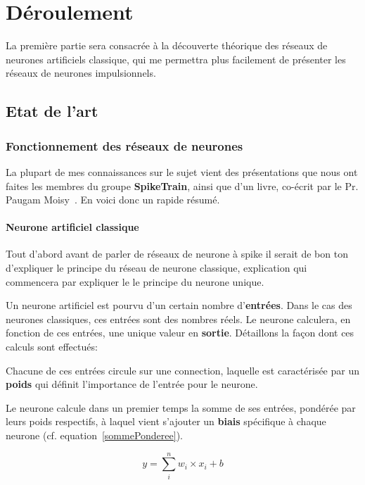 \hypertarget{Deroulement}{%
\chapter{Déroulement}\label{Déroulement}}



La première partie sera consacrée à la découverte théorique des réseaux de neurones artificiels classique, qui me permettra plus facilement de présenter les réseaux de neurones impulsionnels.

\section{Etat de l'art}
\subsection{Fonctionnement des réseaux de neurones}
La plupart de mes connaissances sur le sujet vient des présentations que nous ont faites les membres du groupe \textbf{SpikeTrain}, ainsi que d'un livre, co-écrit par le Pr. Paugam Moisy~\cite{naturalHandbook}.
En voici donc un rapide résumé.

\subsubsection{Neurone artificiel classique}
\label{neuroneClassique}
Tout d'abord avant de parler de réseaux de neurone à spike il serait de bon ton d'expliquer le principe du réseau de neurone classique, explication qui commencera par expliquer le
le principe du neurone unique.

Un neurone artificiel est pourvu d'un certain nombre d'\textbf{entrées}. Dans le cas des neurones classiques, ces entrées sont des nombres réels. Le neurone calculera, en fonction de ces entrées, une unique valeur en \textbf{sortie}.
Détaillons la façon dont ces calculs sont effectués:

Chacune de ces entrées circule sur une connection, laquelle est caractérisée par un \textbf{poids} qui définit l'importance de l'entrée pour le neurone.

Le neurone calcule dans un premier temps la somme de ses entrées, pondérée par leurs poids respectifs, à laquel vient s'ajouter un \textbf{biais} spécifique à chaque neurone (cf. equation~\ref{sommePonderee}).

\begin{equation}
\label{sommePonderee}
y = \sum_{i}^{n} w_i \times x_i + b
\end{equation}

